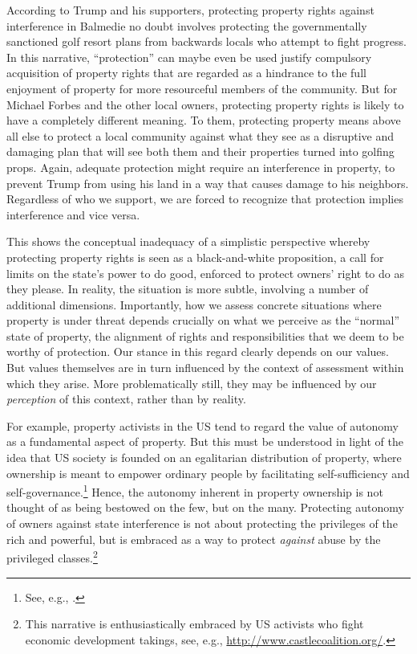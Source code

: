 According to Trump and his supporters, protecting property rights against interference in Balmedie no doubt involves protecting the governmentally sanctioned golf resort plans from backwards locals who attempt to fight progress. In this narrative, ``protection'' can maybe even be used justify compulsory acquisition of property rights that are regarded as a hindrance to the full enjoyment of property for more resourceful members of the community. But for Michael Forbes and the other local owners, protecting property rights is likely to have a completely different meaning. To them, protecting property means above all else to protect a local community against what they see as a disruptive and damaging plan that will see both them and their properties turned into golfing props. Again, adequate protection might require an interference in property, to prevent Trump from using his land in a way that causes damage to his neighbors. Regardless of who we support, we are forced to recognize that protection implies interference and vice versa. 

This shows the conceptual inadequacy of a simplistic perspective whereby protecting property rights is seen as a black-and-white proposition, a call for limits on the state's power to do good, enforced to protect owners' right to do as they please. In reality, the situation is  more subtle, involving a number of additional dimensions. Importantly, how we assess concrete situations where property is under threat depends crucially on what we perceive as the ``normal'' state of property, the alignment of rights and responsibilities that we deem to be worthy of protection. Our stance in this regard clearly depends on our values. But values themselves are in turn influenced by the context of assessment within which they arise. More problematically still, they may be influenced by our \emph{perception} of this context, rather than by reality.

For example, property activists in the US tend to regard the value of autonomy as a fundamental aspect of property. But this must be understood in light of the idea that US society is founded on an egalitarian distribution of property, where ownership is meant to empower ordinary people by facilitating self-sufficiency and self-governance.\footnote{See, e.g., \cite[173]{ely07}.} Hence, the autonomy inherent in property ownership is not thought of as being bestowed on the few, but on the many. Protecting autonomy of owners against state interference is not about protecting the privileges of the rich and powerful, but is embraced as a way to protect {\it against} abuse by the privileged classes.\footnote{This narrative is enthusiastically embraced by US activists who fight economic development takings, see, e.g., \url{http://www.castlecoalition.org/}.} 

